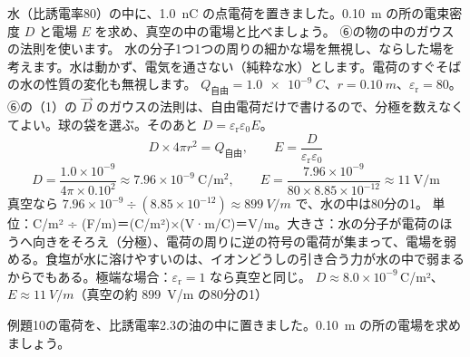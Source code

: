 \begin{phreidai}[水の中の電荷の周りの電場]
\label{ph:電-14:ex10}水（比誘電率80）の中に、\qty{1.0}{nC} の点電荷を置きました。\qty{0.10}{m} の所の電束密度 $D$ と電場 $E$ を求め、真空の中の電場と比べましょう。
\phbamen
⑥の物の中のガウスの法則を使います。
\phmushi
水の分子1つ1つの周りの細かな場を無視し、ならした場を考えます。水は動かず、電気を通さない（純粋な水）とします。電荷のすぐそばの水の性質の変化も無視します。
\phzu
$Q_{\text{自由}}=\qty{1.0e-9}{C}$、$r=\qty{0.10}{m}$、$\varepsilon_{\mathrm r}=80$。
\phriyu
⑥の（1）の $\vec D$ のガウスの法則は、自由電荷だけで書けるので、分極を数えなくてよい。球の袋を選ぶ。そのあと $D=\varepsilon_{\mathrm r}\varepsilon_0E$。
\phtateru
\[ D\times4\pi r^2=Q_{\text{自由}},\qquad E=\frac{D}{\varepsilon_{\mathrm r}\varepsilon_0} \]
\phtoku
\[ D=\frac{1.0\times10^{-9}}{4\pi\times0.10^2}\approx7.96\times10^{-9}\ \mathrm{C/m^2},\qquad E=\frac{7.96\times10^{-9}}{80\times8.85\times10^{-12}}\approx11\ \mathrm{V/m} \]
真空なら $7.96\times10^{-9}\div(8.85\times10^{-12})\approx\qty{899}{V/m}$ で、水の中は80分の1。
\phtashikame
単位：C/m² ÷ (F/m)＝(C/m²)×(V·m/C)＝V/m。大きさ：水の分子が電荷のほうへ向きをそろえ（分極）、電荷の周りに逆の符号の電荷が集まって、電場を弱める。食塩が水に溶けやすいのは、イオンどうしの引き合う力が水の中で弱まるからでもある。極端な場合：$\varepsilon_{\mathrm r}=1$ なら真空と同じ。
\kotae $D\approx8.0\times10^{-9}$\,C/m²、$E\approx\qty{11}{V/m}$（真空の約 \qty{899}{V/m} の80分の1）
\end{phreidai}
\begin{jibun}
例題10の電荷を、比誘電率2.3の油の中に置きました。\qty{0.10}{m} の所の電場を求めましょう。
\end{jibun}

